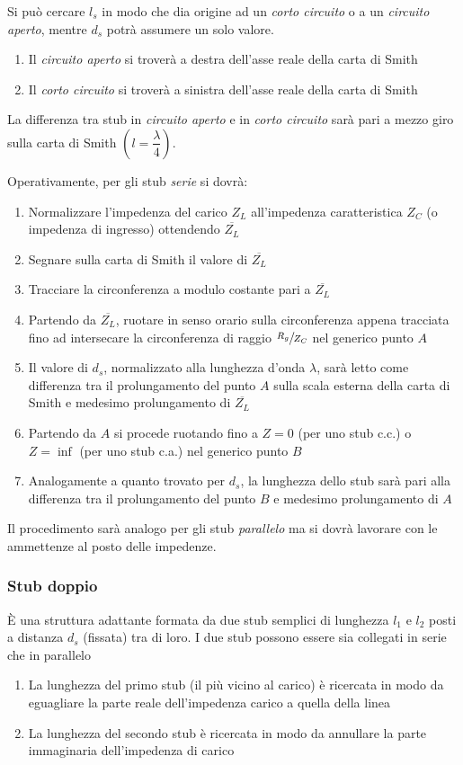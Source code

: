 \documentclass{article}
\begin{document}
Si può cercare \(l_s\) in modo che dia origine ad un \textit{corto circuito} o a un \textit{circuito aperto}, mentre \(d_s\) potrà assumere un solo valore.
\begin{enumerate}
	\item Il \textit{circuito aperto} si troverà a destra dell'asse reale della carta di Smith
	\item Il \textit{corto circuito} si troverà a sinistra dell'asse reale della carta di Smith
\end{enumerate}
La differenza tra stub in \textit{circuito aperto} e in \textit{corto circuito} sarà pari a mezzo giro sulla carta di Smith \(( l = \dfrac{\lambda}{4} )\).

Operativamente, per gli stub \textit{serie} si dovrà:
\begin{enumerate}
	\item Normalizzare l'impedenza del carico \(Z_L\) all'impedenza caratteristica \(Z_C\) (o impedenza di ingresso) ottendendo \(\overline{Z_L}\)
	\item Segnare sulla carta di Smith il valore di \( \overline{Z_L} \)
	\item Tracciare la circonferenza a modulo costante pari a \( \overline{Z_L} \)
	\item Partendo da \(\overline{Z_L}\), ruotare in senso orario sulla circonferenza appena tracciata fino ad intersecare la circonferenza di raggio \(\sfrac{R_g}{Z_C}\) nel generico punto \(A\)
	\item Il valore di \( d_s \), normalizzato alla lunghezza d'onda \( \lambda \), sarà letto come differenza tra il prolungamento del punto \(A\) sulla scala esterna della carta di Smith e medesimo prolungamento di \(\overline{Z_L}\)
	\item Partendo da \(A\) si procede ruotando fino a \(Z = 0\) (per uno stub c.c.) o \( Z = \inf \) (per uno stub c.a.) nel generico punto \(B\)
	\item Analogamente a quanto trovato per \( d_s \), la lunghezza dello stub sarà pari alla differenza tra il prolungamento del punto \(B\) e medesimo prolungamento di \(A\)
\end{enumerate}
Il procedimento sarà analogo per gli stub \textit{parallelo} ma si dovrà lavorare con le ammettenze al posto delle impedenze.

\subsubsection{Stub doppio}
\`E una struttura adattante formata da due stub semplici di lunghezza \(l_1\) e \(l_2\) posti a distanza \(d_s\) (fissata) tra di loro. I due stub possono essere sia collegati in serie che in parallelo
\begin{enumerate}
	\item La lunghezza del primo stub (il più vicino al carico) è ricercata in modo da eguagliare la parte reale dell'impedenza carico a quella della linea
	\item La lunghezza del secondo stub è ricercata in modo da annullare la parte immaginaria dell'impedenza di carico
\end{enumerate}
\end{document}
